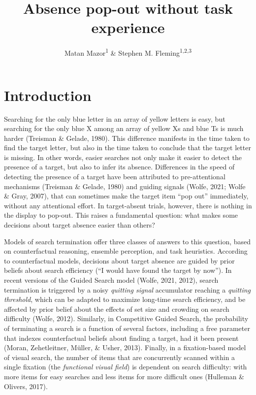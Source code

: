 \documentclass[
  english,
  man]{apa6}
\title{Absence pop-out without task experience}
\author{Matan Mazor\textsuperscript{1} \& Stephen M. Fleming\textsuperscript{1,2,3}}
\date{}
\affiliation{\vspace{0.5cm}\textsuperscript{1} Wellcome Centre for Human Neuroimaging, UCL\\\textsuperscript{2} Max Planck UCL Centre for Computational Psychiatry and Ageing Research\\\textsuperscript{3} Department of Experimental Psychology, UCL}
\begin{document}
\maketitle

\hypertarget{introduction}{%
\section{Introduction}\label{introduction}}

Searching for the only blue letter in an array of yellow letters is easy, but searching for the only blue X among an array of yellow Xs and blue Ts is much harder (Treisman \& Gelade, 1980). This difference manifests in the time taken to find the target letter, but also in the time taken to conclude that the target letter is missing. In other words, easier searches not only make it easier to detect the presence of a target, but also to infer its absence. Differences in the speed of detecting the presence of a target have been attributed to pre-attentional mechanisms (Treisman \& Gelade, 1980) and guiding signals (Wolfe, 2021; Wolfe \& Gray, 2007), that can sometimes make the target item \enquote{pop out} immediately, without any attentional effort. In target-absent trials, however, there is nothing in the display to pop-out. This raises a fundamental question: what makes some decisions about target absence easier than others?

Models of search termination offer three classes of answers to this question, based on counterfactual reasoning, ensemble perception, and task heuristics. According to counterfactual models, decisions about target absence are guided by prior beliefs about search efficiency (\enquote{I would have found the target by now}). In recent versions of the Guided Search model (Wolfe, 2021, 2012), search termination is triggered by a noisy \emph{quitting signal} accumulator reaching a \emph{quitting threshold}, which can be adapted to maximize long-time search efficiency, and be affected by prior belief about the effects of set size and crowding on search difficulty (Wolfe, 2012). Similarly, in Competitive Guided Search, the probability of terminating a search is a function of several factors, including a free parameter that indexes counterfactual beliefs about finding a target, had it been present (Moran, Zehetleitner, Müller, \& Usher, 2013). Finally, in a fixation-based model of visual search, the number of items that are concurrently scanned within a single fixation (the \emph{functional visual field}) is dependent on search difficulty: with more items for easy searches and less items for more difficult ones (Hulleman \& Olivers, 2017).
\end{document}

